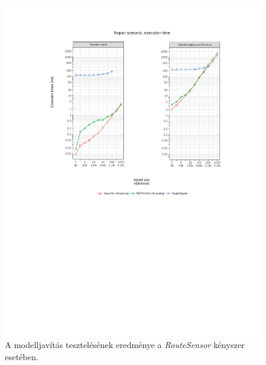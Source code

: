 \begin{figure}[H]
	\centering
	\includegraphics{figures/RouteSensor-times-Repair-Transformation-Recheck.pdf}
	\caption{A modelljavítás tesztelésének eredménye a \emph{RouteSensor} kényszer esetében.}
	\label{fig:RouteSensorRepairResultTransformation}
\end{figure}

